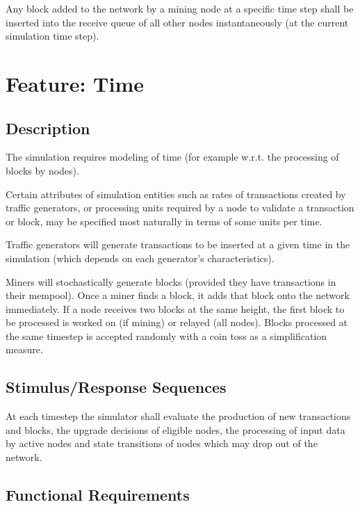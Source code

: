 \documentclass{scrreprt}
\begin{document}
        Any block added to the network by a mining node at a specific time step
        shall be inserted into the receive queue of all other nodes
        instantaneously (at the current simulation time step).

  \section{Feature: Time}

    \subsection{Description}

      The simulation requires modeling of time (for example w.r.t.  the
      processing of blocks by nodes).

      Certain attributes of simulation entities such as rates of transactions
      created by traffic generators, or processing units required by a node
      to validate a transaction or block, may be specified most naturally in
      terms of some units per time.

      Traffic generators will generate transactions to be inserted at a given
      time in the simulation (which depends on each generator's
      characteristics).

      Miners will stochastically generate blocks (provided they have
      transactions in their mempool).
      Once a miner finds a block, it adds that block onto the network immediately.
      If a node receives two blocks at the same height, the first block to be
      processed is worked on (if mining) or relayed (all nodes).
      Blocks processed at the same timestep is accepted randomly with a coin
      toss as a simplification measure.

    \subsection{Stimulus/Response Sequences}

      At each timestep the simulator shall evaluate the production of new
      transactions and blocks, the upgrade decisions of eligible nodes,
      the processing of input data by active nodes and state transitions
      of nodes which may drop out of the network.

    \subsection{Functional Requirements}
\end{document}
